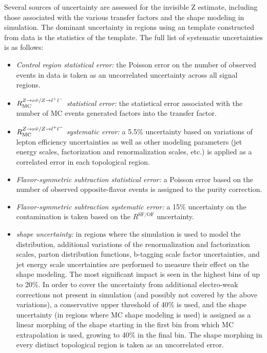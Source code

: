 Several sources of uncertainty are assessed for the invisible Z estimate, including those associated with the various transfer factors and the \mttwo shape modeling in simulation. The dominant uncertainty in regions using an \mttwo template constructed from data is the statistics of the template. The full list of systematic uncertainties is as follows:
\begin{itemize}
	\item {\it Control region statistical error:} the Poisson error on the number of observed events in \zll data is taken as an uncorrelated uncertainty across all signal regions.
	\item {\it $R_{\mathrm{MC}}^{Z\rightarrow\nu\bar{\nu}/Z\rightarrow l^+ l^-}$ statistical error:} the statistical error associated with the number of MC events generated factors into the transfer factor.
	\item {\it $R_{\mathrm{MC}}^{Z\rightarrow\nu\bar{\nu}/Z\rightarrow l^+ l^-}$ systematic error:} a 5.5\% uncertainty based on variations of lepton efficiency uncertainties as well as other modeling parameters (jet energy scales, factorization and renormalization scales, etc.) is applied as a correlated error in each topological region.
	\item {\it Flavor-symmetric subtraction statistical error:} a Poisson error based on the number of observed opposite-flavor events is assigned to the purity correction.
	\item {\it Flavor-symmetric subtraction systematic error:} a 15\% uncertainty on the \ttbar contamination is taken based on the $R^{\mathrm{SF/OF}}$ uncertainty.
	\item {\it \mttwo shape uncertainty:} in regions where the simulation is used to model the \mttwo distribution, additional variations of the renormalization and factorization scales, parton distribution functions, b-tagging scale factor uncertainties, and jet energy scale uncertainties are performed to measure their effect on the \mttwo shape modeling. The most significant impact is seen in the highest \mttwo bins of up to 20\%. In order to cover the uncertainty from additional electro-weak corrections not present in simulation (and possibly not covered by the above variations), a conservative upper threshold of 40\% is used, and the shape uncertainty (in regions where MC \mttwo shape modeling is used) is assigned as a linear morphing of the \mttwo shape starting in the first bin from which MC extrapolation is used, growing to 40\% in the final bin. The shape morphing in every distinct topological region is taken as an uncorrelated error.
	
\end{itemize}


